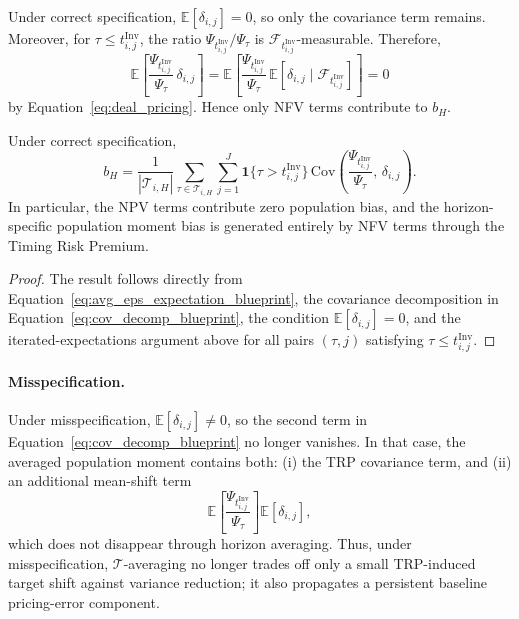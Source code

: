 Under correct specification, $\mathbb{E}[\delta_{i,j}] = 0$, so only the covariance term remains.
Moreover, for $\tau \le t_{i,j}^{\mathrm{Inv}}$, the ratio $\Psi_{t_{i,j}^{\mathrm{Inv}}}/\Psi_\tau$ is $\mathcal{F}_{t_{i,j}^{\mathrm{Inv}}}$-measurable.
Therefore,
\[
\mathbb{E}\!\left[
\frac{\Psi_{t_{i,j}^{\mathrm{Inv}}}}{\Psi_\tau}\,
\delta_{i,j}
\right]
=
\mathbb{E}\!\left[
\frac{\Psi_{t_{i,j}^{\mathrm{Inv}}}}{\Psi_\tau}\,
\mathbb{E}\!\left[
\delta_{i,j}\mid \mathcal{F}_{t_{i,j}^{\mathrm{Inv}}}
\right]
\right]
= 0
\]
by Equation~\ref{eq:deal_pricing}.
Hence only NFV terms contribute to $b_H$.

\begin{lemma}
	\label{lem:bH_TRP}
	Under correct specification,
	\begin{equation}
		\label{eq:bH_TRP_blueprint}
		b_H
		=
		\frac{1}{|\mathcal{T}_{i,H}|}
		\sum_{\tau \in \mathcal{T}_{i,H}}
		\sum_{j=1}^{J}
		\mathbf{1}\{\tau > t_{i,j}^{\mathrm{Inv}}\}
		\,
		\mathrm{Cov}\!\left(
		\frac{\Psi_{t_{i,j}^{\mathrm{Inv}}}}{\Psi_\tau},\,
		\delta_{i,j}
		\right).
	\end{equation}
	In particular, the NPV terms contribute zero population bias, and the horizon-specific population moment bias is generated entirely by NFV terms through the Timing Risk Premium.
\end{lemma}

\begin{proof}
	The result follows directly from Equation~\ref{eq:avg_eps_expectation_blueprint}, the covariance decomposition in Equation~\ref{eq:cov_decomp_blueprint}, the condition $\mathbb{E}[\delta_{i,j}] = 0$, and the iterated-expectations argument above for all pairs $(\tau,j)$ satisfying $\tau \le t_{i,j}^{\mathrm{Inv}}$.
\end{proof}

\paragraph{Misspecification.}
Under misspecification, $\mathbb{E}[\delta_{i,j}] \neq 0$, so the second term in Equation~\ref{eq:cov_decomp_blueprint} no longer vanishes.
In that case, the averaged population moment contains both:
(i) the TRP covariance term, and
(ii) an additional mean-shift term
\[
\mathbb{E}\!\left[
\frac{\Psi_{t_{i,j}^{\mathrm{Inv}}}}{\Psi_\tau}
\right]\mathbb{E}[\delta_{i,j}],
\]
which does not disappear through horizon averaging.
Thus, under misspecification, $\mathcal{T}$-averaging no longer trades off only a small TRP-induced target shift against variance reduction; it also propagates a persistent baseline pricing-error component.

